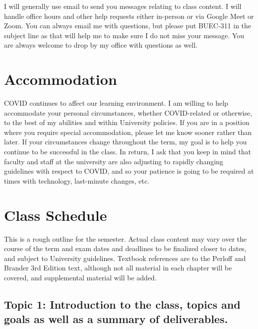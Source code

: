 \documentclass[11pt,]{article}
\begin{document}
I will generally use email to send you messages relating to class
content. I will handle office hours and other help requests either
in-person or via Google Meet or Zoom. You can always email me with
questions, but please put BUEC-311 in the subject line as that will help
me to make sure I do not miss your message. You are always welcome to
drop by my office with questions as well.

\hypertarget{accommodation}{%
\section{Accommodation}\label{accommodation}}

COVID continues to affect our learning environment. I am willing to help
accommodate your personal circumstances, whether COVID-related or
otherwise, to the best of my abilities and within University policies.
If you are in a position where you require special accommodation, please
let me know sooner rather than later. If your circumstances change
throughout the term, my goal is to help you continue to be successful in
the class. In return, I ask that you keep in mind that faculty and staff
at the university are also adjusting to rapidly changing guidelines with
respect to COVID, and so your patience is going to be required at times
with technology, last-minute changes, etc.

\hypertarget{class-schedule}{%
\section{Class Schedule}\label{class-schedule}}

This is a rough outline for the semester. Actual class content may vary
over the course of the term and exam dates and deadlines to be finalized
closer to dates, and subject to University guidelines. Textbook
references are to the Perloff and Brander 3rd Edition text, although not
all material in each chapter will be covered, and supplemental material
will be added.

\hypertarget{topic-1-introduction-to-the-class-topics-and-goals-as-well-as-a-summary-of-deliverables.}{%
\subsection{Topic 1: Introduction to the class, topics and goals as well
as a summary of
deliverables.}\label{topic-1-introduction-to-the-class-topics-and-goals-as-well-as-a-summary-of-deliverables.}}
\end{document}
